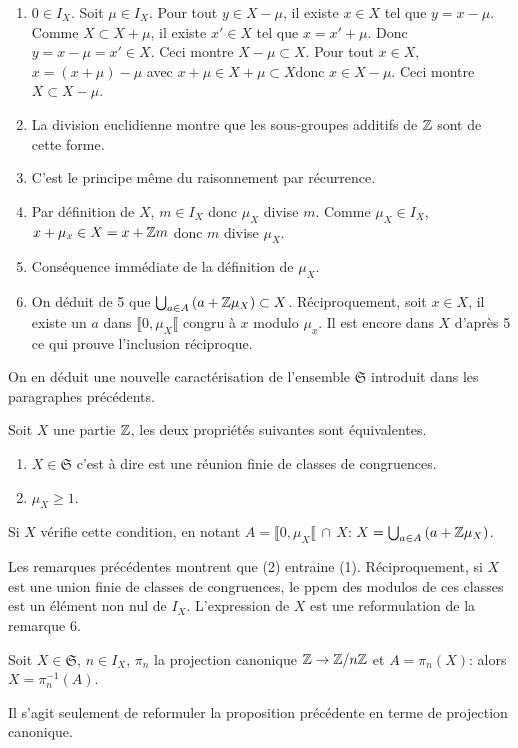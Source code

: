 \begin{demo}
  \begin{enumerate}
    \item $0\in I_X$.\newline
    Soit $\mu \in I_X$.\newline
      Pour tout $y \in X-\mu$, il existe $x \in X$ tel que $y=x-\mu$. Comme $X \subset X + \mu$, il existe $x'\in X$ tel que
$x = x' + \mu$. Donc $y = x - \mu =x'\in X$. Ceci montre $X - \mu \subset X$.\newline
      Pour tout $x \in X$, $x = (x + \mu) - \mu$ avec $x + \mu \in X + \mu \subset X$donc $x \in X - \mu$. Ceci montre $X \subset X - \mu$.
    \item La division euclidienne montre que les sous-groupes additifs de $\mathbb{Z}$ sont de cette forme.
    \item C'est le principe même du raisonnement par récurrence.
    \item Par définition de $X$, $m \in I_X$ donc $\mu_X$ divise $m$. Comme $\mu_X \in I_X$, $x + \mu_x \in X = x +\mathbb{Z} m$ donc $m$ divise $\mu_X$.
    \item Conséquence immédiate de la définition de $\mu_X$.
    \item On déduit de 5 que $\bigcup_{a \in A}\left(a + \mathbb{Z} \mu_X\right) \subset X$. Réciproquement, soit $x\in X$, il existe un $a$ dans $\llbracket 0, \mu_X \llbracket$ congru à $x$ modulo $\mu_x$. Il est encore dans $X$ d'après 5 ce qui prouve l'inclusion réciproque.
  \end{enumerate}
\end{demo}
On en déduit une nouvelle caractérisation de l'ensemble $\mathfrak{S}$ introduit dans les paragraphes précédents.
\begin{propn}
  Soit $X$ une partie $\mathbb{Z}$, les deux propriétés suivantes sont équivalentes.
\begin{enumerate}
  \item $X \in \mathfrak{S}$ c'est à dire est une réunion finie de classes de congruences.
  \item $\mu_X \geq 1$.
\end{enumerate}
Si $X$ vérifie cette condition, en notant $A  = \llbracket 0 , \mu_X \llbracket \, \cap \, X$: $X = \bigcup_{a \in A}\left(a + \mathbb{Z} \mu_X\right)$.
\end{propn}
\begin{demo}
  Les remarques précédentes montrent que (2) entraine (1). Réciproquement, si $X$ est une union finie de classes de congruences, le ppcm des modulos de ces classes est un élément non nul de $I_X$. L'expression de $X$ est une reformulation de la remarque 6.
\end{demo}
\begin{propn}
  Soit $X \in \mathfrak{S}$, $n \in I_X$, $\pi_n$ la projection canonique $\mathbb{Z} \rightarrow \mathbb{Z} / n\mathbb{Z}$ et $A = \pi_n(X)$: alors $X = \pi_n^{-1}(A)$.
\end{propn}
\begin{demo}
  Il s'agit seulement de reformuler la proposition précédente en terme de projection canonique.
\end{demo}


